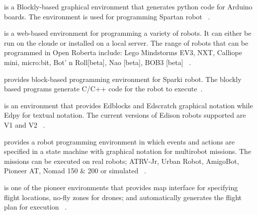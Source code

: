 \parhead{\ardublockly} is a Blockly-based graphical environment that generates python code for Arduino boards. The environment is used for programming Spartan robot ~\cite{Spartan}.%

\parhead{\openroberta} is a web-based environment for programming a variety of robots. It can either be run on the cloude or installed on a local server. The range of robots that can be programmed in Open Roberta include: Lego Mindstorms EV3, NXT, Calliope mini, micro:bit, Bot' n Roll[beta], Nao [beta], BOB3 [beta] ~\cite{OpenRoberta,Jost2015,Ketterl2015}. %

\parhead{\arcbotics} provides block-based programming environment for Sparki robot. The blockly based programs generate C/C++ code for the robot to execute~\cite{ArcboticSparki}. %

\parhead{\edison} is an environment that provides Edblocks and Edscratch graphical notation while Edpy for textual notation. The current versions of Edison robots supported are V1 and V2 ~\cite{Edison}.%

\parhead{\missionlab} provides a robot programming environment in which events and actions are specified in a state machine with graphical notation for multirobot missions. The missions can be executed on real robots; ATRV-Jr, Urban Robot, AmigoBot, Pioneer AT, Nomad 150 \& 200 or simulated ~\cite{arkin2002missionlab,Ulam2007}.%

\parhead{\flyaq} is one of the pioneer environments that provides map interface for specifying flight locations, no-fly zones for drones; and automatically generates the flight plan for execution ~\cite{FLYAQ,DiRuscio2014,Bozhinoski2016}.%

